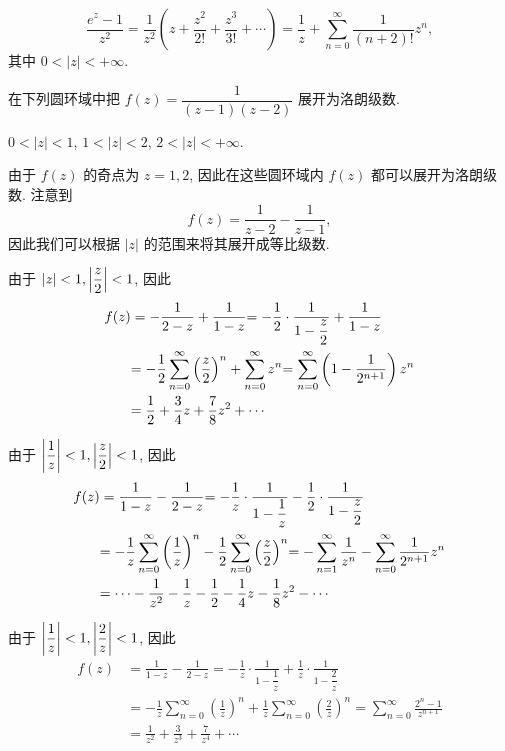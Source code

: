 \begin{solution}
	\[\frac{e^z-1}{z^2}=\frac1{z^2}\left(z+\frac{z^2}{2!}+\frac{z^3}{3!}+\cdots\right)
	{=\frac1z+\sum_{n=0}^\infty \frac1{(n+2)!}z^n,}\]
	{其中 $0<|z|<+\infty$.}
\end{solution}

\begin{example}
	在下列圆环域中把 $f(z)=\dfrac1{(z-1)(z-2)}$ 展开为洛朗级数.

	{ $0<|z|<1$,  $1<|z|<2$,  $2<|z|<+\infty$.}
\end{example}

\begin{solution}
	由于 $f(z)$ 的奇点为 $z=1,2$, 因此在这些圆环域内 $f(z)$ 都可以展开为洛朗级数.
	{注意到
		\[f(z)=\frac1{z-2}-\frac1{z-1},\]
		因此我们可以根据 $|z|$ 的范围来将其展开成等比级数.}

	 由于 $|z|<1,\left|\dfrac z2\right|<1$,
	{因此
		\begin{align*}
			f(z)&=-\frac1{2-z}+\frac1{1-z}
			{=-\frac{1}{2}\cdot\frac1{1-\dfrac z2}+\frac1{1-z}}\\
			&{=-\frac{1}{2}\sum_{n=0}^\infty\left(\frac z2\right)^n+\sum_{n=0}^\infty z^n}
			{=\sum_{n=0}^\infty\left(1-\frac1{2^{n+1}}\right)z^n}\\
			&{=\frac{1}{2} +\frac34z+\frac78z^2+\cdots}
		\end{align*}}

	 由于 $\left|\dfrac1z\right|<1,\left|\dfrac z2\right|<1$, 
	{因此
		\begin{align*}
			f(z)&=\frac1{1-z}-\frac1{2-z}
			{=-\frac1z\cdot\frac1{1-\dfrac1z}-\frac{1}{2}\cdot\frac1{1-\dfrac z2}}\\
			&{=-\frac1z\sum_{n=0}^\infty \left(\frac1z\right)^n-\frac{1}{2}\sum_{n=0}^\infty\left(\frac z2\right)^n}
			{=-\sum_{n=1}^{\infty}\frac1{z^n}-\sum_{n=0}^\infty\frac1{2^{n+1}}z^n}\\
			&{=\cdots-\frac1{z^2}-\frac1z-\frac{1}{2} -\frac14z-\frac18z^2-\cdots}
		\end{align*}}

	 由于 $\left|\dfrac1z\right|<1,\left|\dfrac2z\right|<1$, {因此
		\begin{align*}
			f(z)&=\frac1{1-z}-\frac1{2-z}
				{=-\frac1z\cdot\frac1{1-\dfrac1z}+\frac1z\cdot\frac1{1-\dfrac2z}}\\
			&{=-\frac1z\sum_{n=0}^\infty \left(\frac1z\right)^n+\frac1z\sum_{n=0}^\infty\left(\frac2z\right)^n}
				{=\sum_{n=0}^\infty\frac{2^n-1}{z^{n+1}}}\\
			&{=\frac1{z^2}+\frac3{z^3}+\frac7{z^4}+\cdots}
		\end{align*}}
\end{solution}

